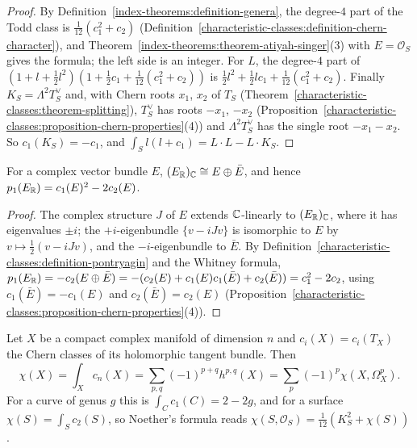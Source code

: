 \begin{proof}
By Definition~\ref{index-theorems:definition-genera}, the degree-$4$ part of the Todd class is $\frac{1}{12}(c_1^2 + c_2)$ (Definition~\ref{characteristic-classes:definition-chern-character}), and Theorem~\ref{index-theorems:theorem-atiyah-singer}(3) with
$E = \mathcal{O}_S$ gives the formula; the left side is an integer. For $L$, the degree-$4$ part of $(1 + l + \frac12l^2)(1 + \frac12c_1 + \frac{1}{12}(c_1^2 + c_2))$ is $\frac12l^2 + \frac12lc_1 + \frac{1}{12}(c_1^2 + c_2)$. Finally
$K_S = \Lambda^2T_S^\vee$ and, with Chern roots $x_1$, $x_2$ of $T_S$ (Theorem~\ref{characteristic-classes:theorem-splitting}), $T_S^\vee$ has roots $-x_1$, $-x_2$
(Proposition~\ref{characteristic-classes:proposition-chern-properties}(4)) and $\Lambda^2T_S^\vee$ has the single root $-x_1 - x_2$. So $c_1(K_S) = -c_1$, and $\int_Sl(l + c_1) = L \cdot L - L \cdot K_S$.
\end{proof}

\begin{lemma}\label{index-theorems:lemma-pontryagin-complex}
For a complex vector bundle $E$, $(E_{\mathbb{R}})_{\mathbb{C}} \cong E \oplus \bar E$, and hence $p_1(E_{\mathbb{R}}) = c_1(E)^2 - 2c_2(E)$.
\end{lemma}

\begin{proof}
The complex structure $J$ of $E$ extends $\mathbb{C}$-linearly to $(E_{\mathbb{R}})_{\mathbb{C}}$, where it has eigenvalues $\pm i$; the $+i$-eigenbundle $\{v - iJv\}$ is isomorphic to $E$ by $v \mapsto \frac12(v - iJv)$, and the $-i$-eigenbundle to $\bar E$. By
Definition~\ref{characteristic-classes:definition-pontryagin} and the Whitney formula, $p_1(E_{\mathbb{R}}) = -c_2(E \oplus \bar E) = -(c_2(E) + c_1(E)c_1(\bar E) + c_2(\bar E)) = c_1^2 - 2c_2$, using $c_1(\bar E) = -c_1(E)$ and $c_2(\bar E) = c_2(E)$
(Proposition~\ref{characteristic-classes:proposition-chern-properties}(4)).
\end{proof}

\begin{corollary}\label{index-theorems:corollary-gauss-bonnet-complex}
Let $X$ be a compact complex manifold of dimension $n$ and $c_i(X) = c_i(T_X)$ the Chern classes of its holomorphic tangent bundle. Then
\[
\chi(X) = \int_Xc_n(X) = \sum_{p,q}(-1)^{p+q}h^{p,q}(X) = \sum_p(-1)^p\chi(X, \Omega^p_X).
\]
For a curve of genus $g$ this is $\int_Cc_1(C) = 2 - 2g$, and for a surface $\chi(S) = \int_Sc_2(S)$, so Noether's formula reads $\chi(S, \mathcal{O}_S) = \frac{1}{12}(K_S^2 + \chi(S))$.
\end{corollary}

